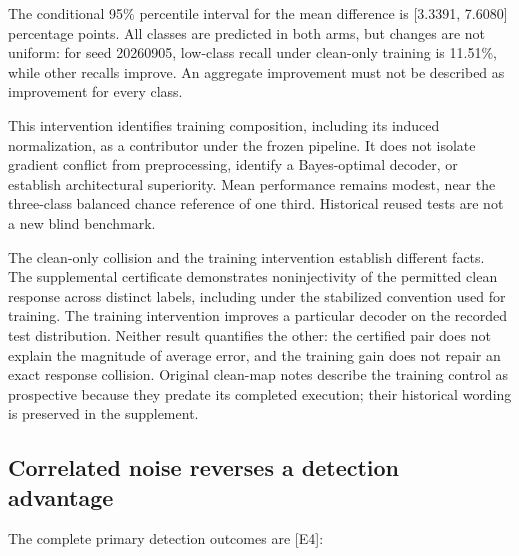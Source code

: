 \documentclass[
  10pt,
]{article}
\begin{document}
The conditional 95\% percentile interval for the mean difference is
{[}3.3391, 7.6080{]} percentage points. All classes are predicted in
both arms, but changes are not uniform: for seed 20260905, low-class
recall under clean-only training is 11.51\%, while other recalls
improve. An aggregate improvement must not be described as improvement
for every class.

This intervention identifies training composition, including its induced
normalization, as a contributor under the frozen pipeline. It does not
isolate gradient conflict from preprocessing, identify a Bayes-optimal
decoder, or establish architectural superiority. Mean performance
remains modest, near the three-class balanced chance reference of one
third. Historical reused tests are not a new blind benchmark.

The clean-only collision and the training intervention establish
different facts. The supplemental certificate demonstrates
noninjectivity of the permitted clean response across distinct labels,
including under the stabilized convention used for training. The
training intervention improves a particular decoder on the recorded test
distribution. Neither result quantifies the other: the certified pair
does not explain the magnitude of average error, and the training gain
does not repair an exact response collision. Original clean-map notes
describe the training control as prospective because they predate its
completed execution; their historical wording is preserved in the
supplement.

\subsection{Correlated noise reverses a detection
advantage}\label{correlated-noise-reverses-a-detection-advantage}

The complete primary detection outcomes are {[}E4{]}:
\end{document}
